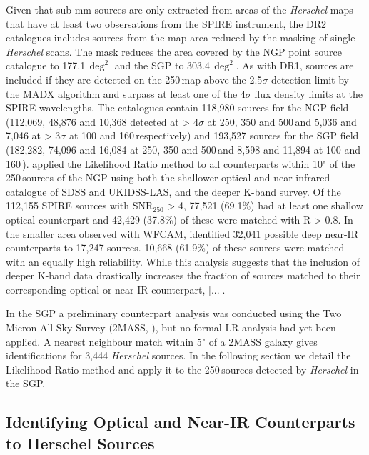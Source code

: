 Given that sub-mm sources are only extracted from areas of the \textit{Herschel} maps that have at least two obsersations from the SPIRE instrument, the DR2 catalogues includes sources from the map area reduced by the masking of single \textit{Herschel} scans. The mask reduces the area covered by the NGP point source catalogue to 177.1\,$\deg^2$ and the SGP to 303.4\,$\deg^2$. As with DR1, sources are included if they are detected on the 250\,\micron map above the 2.5$\sigma$ detection limit by the MADX algorithm and surpass at least one of the 4$\sigma$ flux density limits at the SPIRE wavelengths. The catalogues contain 118,980 sources for the NGP field (112,069, 48,876 and 10,368 detected at > 4$\sigma$ at 250, 350 and 500\,\micron and 5,036 and 7,046 at > 3$\sigma$ at 100 and 160\,\micron respectively) and 193,527 sources for the SGP field (182,282, 74,096 and 16,084 at 250, 350 and 500\,\micron and 8,598 and 11,894 at 100 and 160\,\micron). \citealt{Furlanetto_2018} applied the Likelihood Ratio method to all counterparts within 10" of the 250\,\micron sources of the NGP using both the shallower optical and near-infrared catalogue of SDSS and UKIDSS-LAS, and the deeper K-band survey. Of the 112,155 SPIRE sources with SNR$_{250}$ > 4, 77,521 (69.1\%) had at least one shallow optical counterpart and 42,429 (37.8\%) of these were matched with R > 0.8. In the smaller area observed with WFCAM, \citealt{Furlanetto_2018} identified 32,041 possible deep near-IR counterparts to 17,247 sources. 10,668 (61.9\%) of these sources were matched with an equally high reliability. While this analysis suggests that the inclusion of deeper K-band data drastically increases the fraction of sources matched to their corresponding optical or near-IR counterpart, [...].

In the SGP a preliminary counterpart analysis was conducted using the Two Micron All Sky Survey (2MASS, \citealt{Skrutskie_2006}), but no formal LR analysis had yet been applied. A nearest neighbour match within 5" of a 2MASS galaxy gives identifications for 3,444 \textit{Herschel} sources. In the following section we detail the Likelihood Ratio method and apply it to the 250\,\micron sources detected by \textit{Herschel} in the SGP.

\subsection{Identifying Optical and Near-IR Counterparts to Herschel Sources}
\label{sec:Identifying Optical and Near-IR Counterparts to Herschel Sources}

